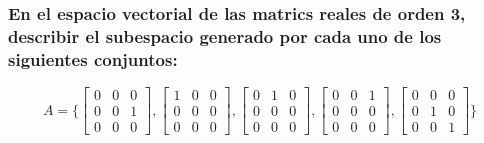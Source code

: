 \documentclass{article}
\begin{document}
\subsubsection{En el espacio vectorial de las matrics reales de orden 3, describir el subespacio generado por cada
uno de los siguientes conjuntos: }
\[
A =
\Bigg \{ 
\begin{bmatrix}
0 & 0 & 0 \\
0 & 0 & 1 \\
0 & 0 & 0
\end{bmatrix},
\begin{bmatrix}
1 & 0 & 0 \\
0 & 0 & 0 \\
0 & 0 & 0
\end{bmatrix},
\begin{bmatrix}
0 & 1 & 0 \\
0 & 0 & 0 \\
0 & 0 & 0
\end{bmatrix},
\begin{bmatrix}
0 & 0 & 1 \\
0 & 0 & 0 \\
0 & 0 & 0
\end{bmatrix},
\begin{bmatrix}
0 & 0 & 0 \\
0 & 1 & 0 \\
0 & 0 & 1
\end{bmatrix}
\Bigg \} 
\]
\end{document}
